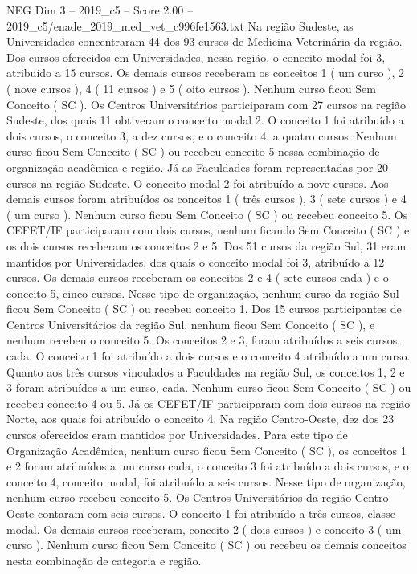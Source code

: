 \begin{textsample}{NEG Dim 3 – 2019\_c5 – Score 2.00 – 2019\_c5/enade\_2019\_med\_vet\_c996fe1563.txt}
Na região Sudeste, as Universidades concentraram 44 dos 93 cursos de Medicina Veterinária da região.
Dos cursos oferecidos em Universidades, nessa região, o conceito modal foi 3, atribuído a 15 cursos.
Os demais cursos receberam os conceitos 1 ( um curso ), 2 ( nove cursos ), 4 ( 11 cursos ) e 5 ( oito cursos ).
Nenhum curso ficou Sem Conceito ( SC ).
Os Centros Universitários participaram com 27 cursos na região Sudeste, dos quais 11 obtiveram o conceito modal 2.
O conceito 1 foi atribuído a dois cursos, o conceito 3, a dez cursos, e o conceito 4, a quatro cursos.
Nenhum curso ficou Sem Conceito ( SC ) ou recebeu conceito 5 nessa combinação de organização acadêmica e região.
Já as Faculdades foram representadas por 20 cursos na região Sudeste.
O conceito modal 2 foi atribuído a nove cursos.
Aos demais cursos foram atribuídos os conceitos 1 ( três cursos ), 3 ( sete cursos ) e 4 ( um curso ).
Nenhum curso ficou Sem Conceito ( SC ) ou recebeu conceito 5.
Os CEFET/IF participaram com dois cursos, nenhum ficando Sem Conceito ( SC ) e os dois cursos receberam os conceitos 2 e 5.
Dos 51 cursos da região Sul, 31 eram mantidos por Universidades, dos quais o conceito modal foi 3, atribuído a 12 cursos.
Os demais cursos receberam os conceitos 2 e 4 ( sete cursos cada ) e o conceito 5, cinco cursos.
Nesse tipo de organização, nenhum curso da região Sul ficou Sem Conceito ( SC ) ou recebeu conceito 1.
Dos 15 cursos participantes de Centros Universitários da região Sul, nenhum ficou Sem Conceito ( SC ), e nenhum recebeu o conceito 5.
Os conceitos 2 e 3, foram atribuídos a seis cursos, cada.
O conceito 1 foi atribuído a dois cursos e o conceito 4 atribuído a um curso.
Quanto aos três cursos vinculados a Faculdades na região Sul, os conceitos 1, 2 e 3 foram atribuídos a um curso, cada.
Nenhum curso ficou Sem Conceito ( SC ) ou recebeu conceito 4 ou 5.
Já os CEFET/IF participaram com dois cursos na região Norte, aos quais foi atribuído o conceito 4.
Na região Centro-Oeste, dez dos 23 cursos oferecidos eram mantidos por Universidades.
Para este tipo de Organização Acadêmica, nenhum curso ficou Sem Conceito ( SC ), os conceitos 1 e 2 foram atribuídos a um curso cada, o conceito 3 foi atribuído a dois cursos, e o conceito 4, conceito modal, foi atribuído a seis cursos.
Nesse tipo de organização, nenhum curso recebeu conceito 5.
Os Centros Universitários da região Centro-Oeste contaram com seis cursos.
O conceito 1 foi atribuído a três cursos, classe modal.
Os demais cursos receberam, conceito 2 ( dois cursos ) e conceito 3 ( um curso ).
Nenhum curso ficou Sem Conceito ( SC ) ou recebeu os demais conceitos nesta combinação de categoria e região.

\end{textsample}
